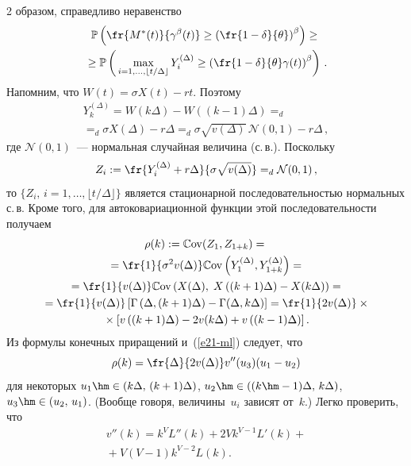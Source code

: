 \begin{multicols}{2}
образом, справедливо неравенство
\begin{multline}
\mathbb{P} \left( \fr{M^*(t)}{\gamma^\beta(t)} \geq\left(
\fr{1-\delta}{\theta}\right)^\beta \right) \geq{}\\
{}\geq \mathbb{P} \left(
\vphantom{\left(\fr{1-\delta}{theta}\right)^\beta}
\max\limits_{i=1,\ldots ,\lfloor t/\Delta \rfloor}Y_i^{(\Delta)} \geq
\left(\fr{1-\delta}{\theta}\gamma (t)\right)^\beta\right)\,.
\label{asymp1-l4}
\end{multline}
Напомним, что  $W(t)=\sigma X(t)-rt$. Поэтому
\begin{multline*}
Y_k^{(\Delta)}= W(k\Delta)-W((k-1)\Delta)=_d{}\\
{}=_d \sigma X(\Delta)-r\Delta =_d \sigma \sqrt{v(\Delta)}\,\mathcal{N} (0,1)-r\Delta\,,
\end{multline*}
где $\mathcal{N} (0,1)$~--- нормальная случайная величина (с.\,в.). Поскольку
\begin{equation}
Z_i :=\fr{Y_i^{(\Delta)}+r\Delta }{\sigma \sqrt{v(\Delta)}}=_d
\mathcal{N}(0,1)\,,\label{e19-ml}
\end{equation} 
то $\{Z_i,\,i=1,\ldots,\lfloor t/\Delta \rfloor\}$  
является  стационарной последовательностью нормальных
с.\,в. Кроме того, для автоковариационной функции этой
последовательности получаем
\begin{multline}
\rho(k):=\mathbb{C}\mathrm{ov}(Z_1,Z_{1+k})
={}\\
{}=\fr{1}{\sigma^2 v(\Delta)}\mathbb{C}\mathrm{ov} \left( Y_1^{(\Delta)},Y_{1+k}^{(\Delta)} \right)={}\\
{}=\fr{1}{v(\Delta)}\mathbb{C}\mathrm{ov} \left(X(\Delta),\;X\left((k+1)\Delta\right)-X(k\Delta) \right)={}\\
{}=\fr{1}{v(\Delta)}\left[
\Gamma\left(\Delta,(k+1)\Delta\right)-\Gamma(\Delta,k\Delta) \right]=
\fr{1}{2v(\Delta)}\times{}\\
{}\times\left[ v\left( (k+1)\Delta
\right)-2v(k\Delta)+v\left( (k-1)\Delta\right) \right].\label{e21-ml}
\end{multline}
Из  формулы конечных приращений и~(\ref{e21-ml}) следует, что
$$
\rho(k)=\fr{\Delta}{2v(\Delta)}v''(u_3)(u_1-u_2)
$$
для некоторых $u_1\hm\in (k \Delta,\,(k+1)\Delta)$, $u_2\hm \in((k\hm-1)\Delta,\,k\Delta)$, 
$u_3\hm\in (u_2,\,u_1)$. (Вообще говоря,
величины~$u_i$  зависят от~$k$.) Легко проверить, что
\begin{multline}
v''(k)=k^VL''(k)+2Vk^{V-1}L'(k)+{}\\
{}+V(V-1)k^{V-2}L(k). 
\label{21'}
\end{multline}

\end{multicols}
